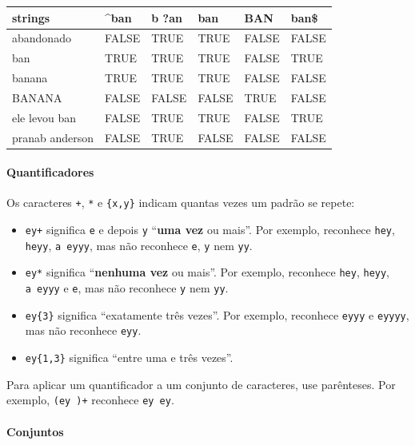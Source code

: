 \documentclass[
]{book}
\begin{document}
\begin{tabular}{l|l|l|l|l|l}
\hline
strings & \textasciicircum{}ban & b ?an & ban & BAN & ban\$\\
\hline
abandonado & FALSE & TRUE & TRUE & FALSE & FALSE\\
\hline
ban & TRUE & TRUE & TRUE & FALSE & TRUE\\
\hline
banana & TRUE & TRUE & TRUE & FALSE & FALSE\\
\hline
BANANA & FALSE & FALSE & FALSE & TRUE & FALSE\\
\hline
ele levou ban & FALSE & TRUE & TRUE & FALSE & TRUE\\
\hline
pranab anderson & FALSE & TRUE & FALSE & FALSE & FALSE\\
\hline
\end{tabular}

\hypertarget{quantificadores}{%
\paragraph*{Quantificadores}\label{quantificadores}}

Os caracteres \texttt{+}, \texttt{*} e \texttt{\{x,y\}} indicam quantas vezes um padrão se repete:

\begin{itemize}
\item
  \texttt{ey+} significa \texttt{e} e depois \texttt{y} ``\textbf{uma vez} ou mais''. Por exemplo, reconhece \texttt{hey}, \texttt{heyy}, \texttt{a\ eyyy}, mas não reconhece \texttt{e}, \texttt{y} nem \texttt{yy}.
\item
  \texttt{ey*} significa ``\textbf{nenhuma vez} ou mais''. Por exemplo, reconhece \texttt{hey}, \texttt{heyy}, \texttt{a\ eyyy} e \texttt{e}, mas não reconhece \texttt{y} nem \texttt{yy}.
\item
  \texttt{ey\{3\}} significa ``exatamente três vezes''. Por exemplo, reconhece \texttt{eyyy} e \texttt{eyyyy}, mas não reconhece \texttt{eyy}.
\item
  \texttt{ey\{1,3\}} significa ``entre uma e três vezes''.
\end{itemize}

Para aplicar um quantificador a um conjunto de caracteres, use parênteses. Por exemplo, \texttt{(ey\ )+} reconhece \texttt{ey\ ey}.

\hypertarget{conjuntos}{%
\paragraph*{Conjuntos}\label{conjuntos}}
\end{document}
